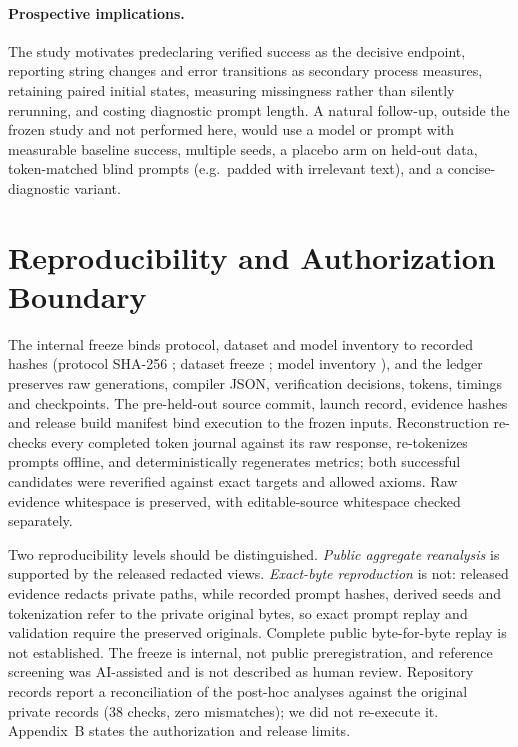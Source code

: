 \documentclass[runningheads,a4paper]{llncs}
\begin{document}
\paragraph{Prospective implications.} The study motivates predeclaring verified
success as the decisive endpoint, reporting string changes and error transitions as
secondary process measures, retaining paired initial states, measuring missingness
rather than silently rerunning, and costing diagnostic prompt length. A natural
follow-up, outside the frozen study and not performed here, would use a model or
prompt with measurable baseline success, multiple seeds, a placebo arm on held-out
data, token-matched blind prompts (e.g.\ padded with irrelevant text), and a
concise-diagnostic variant.

\section{Reproducibility and Authorization Boundary}
The internal freeze binds protocol, dataset and model inventory to recorded hashes
(protocol SHA-256 ;
dataset freeze ;
model inventory ),
and the ledger preserves raw generations, compiler JSON, verification decisions,
tokens, timings and checkpoints. The pre-held-out source commit, launch record, evidence hashes and release
build manifest bind execution to the frozen inputs. Reconstruction re-checks
every completed token journal against its raw response, re-tokenizes prompts
offline, and deterministically regenerates metrics; both successful
candidates were reverified against exact targets and allowed axioms. Raw
evidence whitespace is preserved, with editable-source whitespace checked
separately.

Two reproducibility levels should be distinguished. \emph{Public aggregate
reanalysis} is supported by the released redacted views. \emph{Exact-byte
reproduction} is not: released evidence redacts private paths, while recorded prompt
hashes, derived seeds and tokenization refer to the private original bytes, so exact
prompt replay and validation require the preserved originals. Complete public
byte-for-byte replay is not established. The freeze is internal, not public
preregistration, and reference screening was AI-assisted and is not described as
human review. Repository records report a reconciliation of the post-hoc analyses against the original private records (38 checks, zero mismatches); we did not re-execute it. Appendix~B states the authorization and release limits.
\end{document}
